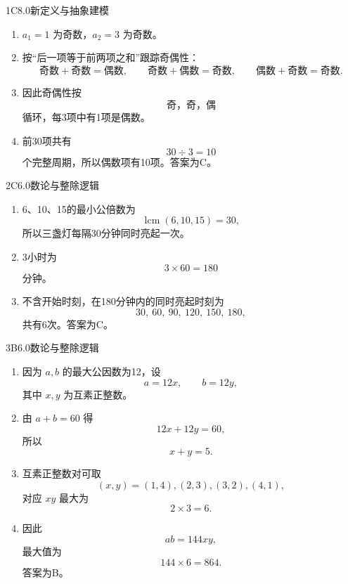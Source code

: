 

\begin{solution}{1}{C}{8.0}{新定义与抽象建模}
\begin{enumerate}[label=\textbf{Step \arabic*:},leftmargin=*]
  \item \(a_1=1\) 为奇数，\(a_2=3\) 为奇数。
  \item 按“后一项等于前两项之和”跟踪奇偶性：
  \[
    \text{奇数}+\text{奇数}=\text{偶数},\qquad
    \text{奇数}+\text{偶数}=\text{奇数},\qquad
    \text{偶数}+\text{奇数}=\text{奇数}.
  \]
  \item 因此奇偶性按
  \[
    \text{奇，奇，偶}
  \]
  循环，每3项中有1项是偶数。
  \item 前30项共有
  \[
    30\div3=10
  \]
  个完整周期，所以偶数项有10项。答案为C。
\end{enumerate}
\end{solution}

\begin{solution}{2}{C}{6.0}{数论与整除逻辑}
\begin{enumerate}[label=\textbf{Step \arabic*:},leftmargin=*]
  \item 6、10、15的最小公倍数为
  \[
    \operatorname{lcm}(6,10,15)=30,
  \]
  所以三盏灯每隔30分钟同时亮起一次。
  \item 3小时为
  \[
    3\times60=180
  \]
  分钟。
  \item 不含开始时刻，在180分钟内的同时亮起时刻为
  \[
    30,\ 60,\ 90,\ 120,\ 150,\ 180,
  \]
  共有6次。答案为C。
\end{enumerate}
\end{solution}

\begin{solution}{3}{B}{6.0}{数论与整除逻辑}
\begin{enumerate}[label=\textbf{Step \arabic*:},leftmargin=*]
  \item 因为 \(a,b\) 的最大公因数为12，设
  \[
    a=12x,\qquad b=12y,
  \]
  其中 \(x,y\) 为互素正整数。
  \item 由 \(a+b=60\) 得
  \[
    12x+12y=60,
  \]
  所以
  \[
    x+y=5.
  \]
  \item 互素正整数对可取
  \[
    (x,y)=(1,4),(2,3),(3,2),(4,1),
  \]
  对应 \(xy\) 最大为
  \[
    2\times3=6.
  \]
  \item 因此
  \[
    ab=144xy,
  \]
  最大值为
  \[
    144\times6=864.
  \]
  答案为B。
\end{enumerate}
\end{solution}

